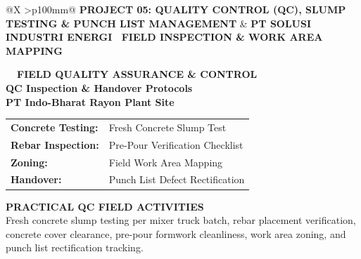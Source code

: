 \documentclass[10pt,a4paper,landscape]{article}
\makeatletter
\newcommand{\makeheader}[3]{%
  \begin{tcolorbox}[sharp corners, boxrule=0pt, colframe=pnavy, colback=pnavy, coltext=white, left=4mm, right=4mm, top=2mm, bottom=2mm, boxsep=0pt, height=13mm, valign=center, borderline west={3.5pt}{0pt}{pred}]
    \begin{tabularx}{\linewidth}{@{}X >{\raggedleft\arraybackslash}p{100mm}@{}}
      {\fontsize{11pt}{13.5pt}\selectfont\bfseries\color{white}#2} &
      {\fontsize{8pt}{10pt}\selectfont\bfseries\color{pbglight}#3}
    \end{tabularx}
  \end{tcolorbox}
  \vspace{2mm}
}
\makeatother
\begin{document}
\newpage
\makeheader{// GROUP 2: CONSTRUCTION MANAGEMENT \& SITE SUPERVISION // PROJECT 05}{PROJECT 05: QUALITY CONTROL (QC), SLUMP TESTING \& PUNCH LIST MANAGEMENT}{PT SOLUSI INDUSTRI ENERGI \textbar\ FIELD INSPECTION \& WORK AREA MAPPING}

\noindent
\begin{minipage}[t]{0.30\linewidth}
  \vspace{0pt}
  \begin{tcolorbox}[sharp corners, boxrule=0.8pt, colframe=pborder, colback=white, left=3mm, right=3mm, top=2.5mm, bottom=2.5mm, height=100mm]
    \colorbox{pred}{\fontsize{7pt}{8pt}\selectfont\bfseries\color{white}\ \ FIELD QUALITY ASSURANCE \& CONTROL\ \ }\\[1.5mm]
    {\fontsize{9.5pt}{11.5pt}\selectfont\bfseries\color{pnavy}QC Inspection \& Handover Protocols}\\[0.5mm]
    {\fontsize{7pt}{8.5pt}\selectfont\bfseries\color{pred}PT Indo-Bharat Rayon Plant Site}\\[2mm]

    \begin{tcolorbox}[sharp corners, boxrule=0.5pt, colframe=pborder, colback=pbglight, left=2mm, right=2mm, top=1.5mm, bottom=1.5mm]
      \begin{tabularx}{\linewidth}{@{}p{22mm} X@{}}
        {\fontsize{6.8pt}{8pt}\selectfont\bfseries Concrete Testing:} & {\fontsize{6.8pt}{8pt}\selectfont Fresh Concrete Slump Test} \\[0.8mm]
        {\fontsize{6.8pt}{8pt}\selectfont\bfseries Rebar Inspection:} & {\fontsize{6.8pt}{8pt}\selectfont Pre-Pour Verification Checklist} \\[0.8mm]
        {\fontsize{6.8pt}{8pt}\selectfont\bfseries Zoning:} & {\fontsize{6.8pt}{8pt}\selectfont Field Work Area Mapping} \\[0.8mm]
        {\fontsize{6.8pt}{8pt}\selectfont\bfseries Handover:} & {\fontsize{6.8pt}{8pt}\selectfont Punch List Defect Rectification}
      \end{tabularx}
    \end{tcolorbox}
    \vspace{1.5mm}

    {\fontsize{7.5pt}{9pt}\selectfont\bfseries\color{pnavy}PRACTICAL QC FIELD ACTIVITIES}\\[0.8mm]
    {\fontsize{6.5pt}{8.2pt}\selectfont\color{psteel}
    Fresh concrete slump testing per mixer truck batch, rebar placement verification, concrete cover clearance, pre-pour formwork cleanliness, work area zoning, and punch list rectification tracking.
    }
  \end{tcolorbox}
  \vspace{2mm}


\end{minipage}
\end{document}
